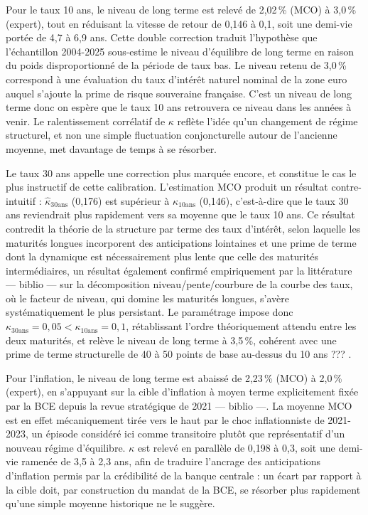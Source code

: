 Pour le taux 10 ans, le niveau de long terme est relevé de 2,02\,\% (MCO) à 3,0\,\% (expert), tout en réduisant la vitesse de retour de 0,146 à 0,1, soit une demi-vie portée de 4,7 à 6,9 ans. Cette double correction traduit l'hypothèse que l'échantillon 2004-2025 sous-estime le niveau d'équilibre de long terme en raison du poids disproportionné de la période de taux bas. Le niveau retenu de 3,0\,\% correspond à une évaluation du taux d'intérêt naturel nominal de la zone euro auquel s'ajoute la prime de risque souveraine française. C'est un niveau de long terme donc on espère que le taux 10 ans retrouvera ce niveau dans les années à venir. Le ralentissement corrélatif de $\kappa$ reflète l'idée qu'un changement de régime structurel, et non une simple fluctuation conjoncturelle autour de l'ancienne moyenne, met davantage de temps à se résorber.

Le taux 30 ans appelle une correction plus marquée encore, et constitue le cas le plus instructif de cette calibration. L'estimation MCO produit un résultat contre-intuitif : $\hat{\kappa}_{30\text{ans}}$ (0,176) est supérieur à $\hat{\kappa}_{10\text{ans}}$ (0,146), c'est-à-dire que le taux 30 ans reviendrait plus rapidement vers sa moyenne que le taux 10 ans. Ce résultat contredit la théorie de la structure par terme des taux d'intérêt, selon laquelle les maturités longues incorporent des anticipations lointaines et une prime de terme dont la dynamique est nécessairement plus lente que celle des maturités intermédiaires, un résultat également confirmé empiriquement par la littérature --- biblio --- sur la décomposition niveau/pente/courbure de la courbe des taux, où le facteur de niveau, qui domine les maturités longues, s'avère systématiquement le plus persistant. Le paramétrage impose donc $\kappa_{30\text{ans}} = 0{,}05 < \kappa_{10\text{ans}} = 0{,}1$, rétablissant l'ordre théoriquement attendu entre les deux maturités, et relève le niveau de long terme à 3,5\,\%, cohérent avec une prime de terme structurelle de 40 à 50 points de base au-dessus du 10 ans ??? .

Pour l'inflation, le niveau de long terme est abaissé de 2,23\,\% (MCO) à 2,0\,\% (expert), en s'appuyant sur la cible d'inflation à moyen terme explicitement fixée par la BCE depuis la revue stratégique de 2021 --- biblio ---. La moyenne MCO est en effet mécaniquement tirée vers le haut par le choc inflationniste de 2021-2023, un épisode considéré ici comme transitoire plutôt que représentatif d'un nouveau régime d'équilibre. $\kappa$ est relevé en parallèle de 0,198 à 0,3, soit une demi-vie ramenée de 3,5 à 2,3 ans, afin de traduire l'ancrage des anticipations d'inflation permis par la crédibilité de la banque centrale : un écart par rapport à la cible doit, par construction du mandat de la BCE, se résorber plus rapidement qu'une simple moyenne historique ne le suggère.

